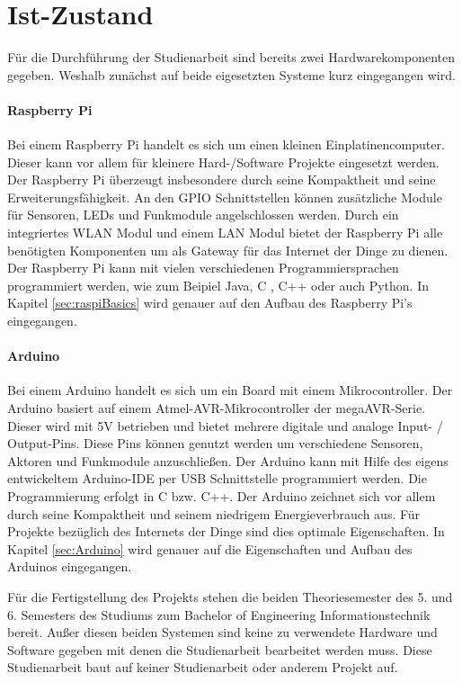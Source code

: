 \section{Ist-Zustand}
\label{sec:IstZustand}
Für die Durchführung der Studienarbeit sind bereits zwei Hardwarekomponenten gegeben. Weshalb zunächst auf beide eigesetzten Systeme kurz eingegangen wird.
\paragraph{Raspberry Pi} 
Bei einem Raspberry Pi handelt es sich um einen kleinen Einplatinencomputer. Dieser kann vor allem für kleinere Hard-/Software Projekte eingesetzt werden. Der Raspberry Pi überzeugt insbesondere durch seine Kompaktheit und seine Erweiterungsfähigkeit. An den \ac{GPIO} Schnittstellen können zusätzliche Module für Sensoren, LEDs und Funkmodule angelschlossen werden.  Durch ein integriertes WLAN Modul und einem LAN Modul bietet der Raspberry Pi alle benötigten Komponenten um als Gateway für das Internet der Dinge zu dienen. Der Raspberry Pi kann mit vielen verschiedenen Programmiersprachen programmiert werden, wie zum Beipiel Java, C , C++ oder auch Python. In Kapitel \ref{sec:raspiBasics} wird genauer auf den Aufbau des Raspberry Pi’s eingegangen.  
\paragraph{Arduino} 
Bei einem Arduino handelt es sich um ein Board mit einem Mikrocontroller. Der Arduino basiert auf einem Atmel-AVR-Mikrocontroller der megaAVR-Serie. Dieser wird mit 5V betrieben und bietet mehrere digitale und analoge Input- / Output-Pins.  Diese Pins können genutzt werden um verschiedene Sensoren, Aktoren und Funkmodule anzuschließen. Der Arduino kann mit Hilfe des eigens entwickeltem Arduino-IDE per USB Schnittstelle programmiert werden. Die Programmierung erfolgt in C bzw. C++. Der Arduino zeichnet sich vor allem durch seine Kompaktheit und seinem niedrigem Energieverbrauch aus. Für Projekte bezüglich des Internets der Dinge sind dies optimale  Eigenschaften.   In Kapitel \ref{sec:Arduino} wird genauer auf die Eigenschaften und Aufbau des Arduinos eingegangen.

Für die Fertigstellung des Projekts stehen die beiden Theoriesemester des 5. und 6. Semesters des Studiums zum Bachelor of Engineering Informationstechnik bereit. Außer diesen beiden Systemen sind keine zu verwendete Hardware und Software gegeben mit denen die Studienarbeit bearbeitet werden muss. Diese Studienarbeit baut auf keiner Studienarbeit oder anderem Projekt auf.

